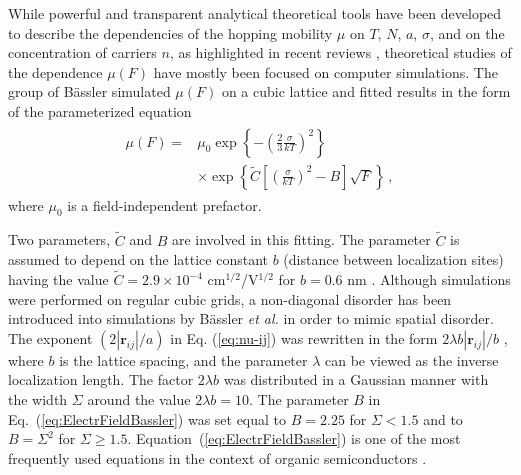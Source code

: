 \documentclass[aps,reprint,amsmath,amssymb,superscriptaddress,showpacs,prb]{revtex4-1}
\renewcommand{\alpha}{ a }
\begin{document}
While powerful and transparent analytical theoretical tools have been developed to describe the dependencies of the hopping mobility $\mu$ on $T$, $N$, $\alpha$, $\sigma$, and on the concentration of carriers $n$, as highlighted in recent reviews \cite{Baranovski2006,Tessler2009,Baranovskii2014,Nenashev_Topical_2015,Ostroverkhova2016}, theoretical studies of the dependence $\mu(F)$ have mostly been focused on computer simulations. The group of B\"{a}ssler simulated $\mu(F)$ on a cubic lattice and fitted results in the form of the parameterized equation \cite{Borsenberger1991,Bassler1993,Anna_Heinz_2015}
\begin{align}
	\label{eq:ElectrFieldBassler}
	\begin{split}
	\mu(F)= & \mu_{0} \exp{\left\{-\left(\frac{2}{3}
	\frac{\sigma}{kT}\right)^{2}\right\}} \\
	        & \times \exp\left\{\widetilde{C}\left[\left(\frac{\sigma}{kT}\right)^{2}
	-B\right]\sqrt{F}\right\} \, ,
	\end{split}
\end{align}
where $\mu_0$ is a field-independent prefactor.

Two parameters, $\widetilde{C}$ and $B$ are involved in this fitting. The parameter $\widetilde{C}$ is assumed to depend on the lattice constant $b$ (distance between localization sites) having the value  $\widetilde{C} = 2.9 \times 10^{-4}$ cm$^{1/2}$/V$^{1/2}$ for $b=0.6$ nm \cite{Borsenberger1991,Bassler1993,Anna_Heinz_2015}. Although simulations were performed on regular cubic grids, a non-diagonal disorder has been introduced into simulations by B\"{a}ssler \textit{et al.} \cite{Borsenberger1991,Bassler1993,Anna_Heinz_2015}  in order to mimic spatial disorder. The exponent $(2|\mathbf{r}_{ij}|/a)$ in Eq. (\ref{eq:nu-ij}) was rewritten in the form $2\lambda b|\mathbf{r}_{ij}|/b$ , where $b$ is the lattice spacing, and the parameter $\lambda$ can be viewed as the inverse localization length. The factor $2 \lambda b$ was distributed in a Gaussian manner with the width $\Sigma$ around the value $2 \lambda b=10$. The parameter $B$ in Eq.~(\ref{eq:ElectrFieldBassler}) was set equal to $B = 2.25$ for $\Sigma < 1.5$ and to $B = \Sigma^{2}$ for $\Sigma \geq 1.5$.  Equation~(\ref{eq:ElectrFieldBassler}) is one of the most frequently used equations in the context of organic
semiconductors \cite{Tessler2009,Baranovskii2014}.





\end{document}
